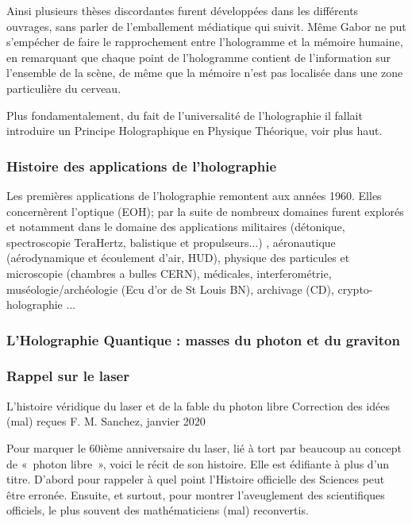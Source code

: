 \documentclass[a4paper,12pt]{article}
\begin{document}
Ainsi plusieurs thèses discordantes furent développées dans les différents ouvrages, sans parler de l'emballement médiatique qui suivit. Même Gabor ne put s'empécher de faire le rapprochement entre l'hologramme et la mémoire humaine, en remarquant que chaque point de l'hologramme contient de l'information sur l'ensemble de la scène, de même que la mémoire n'est pas localisée dans une zone particulière du cerveau.


Plus fondamentalement, du fait de l'universalité de l'holographie il fallait introduire un Principe Holographique en Physique Théorique, voir plus haut.




\subsubsection{Histoire des applications de l'holographie}

Les premières applications de l'holographie remontent aux années 1960. Elles concernèrent l'optique (EOH); par la suite de nombreux domaines furent explorés et notamment dans le domaine des applications militaires (détonique, spectroscopie TeraHertz, balistique et propulseurs...) \cite{ISL}, aéronautique (aérodynamique et écoulement d'air, HUD), physique des particules et microscopie (chambres a bulles CERN), médicales, interferométrie, muséologie/archéologie (Ecu d'or de St Louis BN), archivage (CD), crypto-holographie ...



\subsubsection{L'Holographie Quantique : masses du photon et du graviton}

\subsubsection{Rappel sur le laser}

L'histoire véridique du laser et de la fable du photon libre
Correction des idées (mal) reçues
F. M. Sanchez, janvier 2020

Pour marquer le 60ième anniversaire du laser, lié à tort par beaucoup au concept de « photon libre »,  voici le récit de son histoire. Elle est édifiante à plus d'un titre. D'abord pour rappeler à quel point l'Histoire officielle des Sciences peut être erronée. Ensuite, et surtout, pour montrer l'aveuglement des scientifiques officiels, le plus souvent des mathématiciens (mal) reconvertis.
\end{document}
